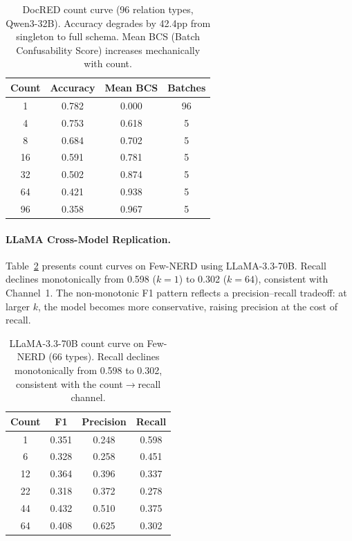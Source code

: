 \documentclass[11pt,a4paper]{article}
\begin{document}
\begin{table}[t]
\centering
\small
\begin{tabular}{cccc}
\toprule
Count & Accuracy & Mean BCS & Batches \\
\midrule
1  & 0.782 & 0.000 & 96 \\
4  & 0.753 & 0.618 & 5 \\
8  & 0.684 & 0.702 & 5 \\
16 & 0.591 & 0.781 & 5 \\
32 & 0.502 & 0.874 & 5 \\
64 & 0.421 & 0.938 & 5 \\
96 & 0.358 & 0.967 & 5 \\
\bottomrule
\end{tabular}
\caption{DocRED count curve (96 relation types, Qwen3-32B). Accuracy degrades by 42.4pp from singleton to full schema. Mean BCS (Batch Confusability Score) increases mechanically with count.}
\label{tab:docred-count}
\end{table}

\paragraph{LLaMA Cross-Model Replication.}
Table~\ref{tab:llama-count} presents count curves on Few-NERD using LLaMA-3.3-70B. Recall declines monotonically from 0.598 ($k=1$) to 0.302 ($k=64$), consistent with Channel~1. The non-monotonic F1 pattern reflects a precision--recall tradeoff: at larger $k$, the model becomes more conservative, raising precision at the cost of recall.

\begin{table}[t]
\centering
\small
\begin{tabular}{cccc}
\toprule
Count & F1 & Precision & Recall \\
\midrule
1  & 0.351 & 0.248 & 0.598 \\
6  & 0.328 & 0.258 & 0.451 \\
12 & 0.364 & 0.396 & 0.337 \\
22 & 0.318 & 0.372 & 0.278 \\
44 & 0.432 & 0.510 & 0.375 \\
64 & 0.408 & 0.625 & 0.302 \\
\bottomrule
\end{tabular}
\caption{LLaMA-3.3-70B count curve on Few-NERD (66 types). Recall declines monotonically from 0.598 to 0.302, consistent with the count$\to$recall channel.}
\label{tab:llama-count}
\end{table}
\end{document}
